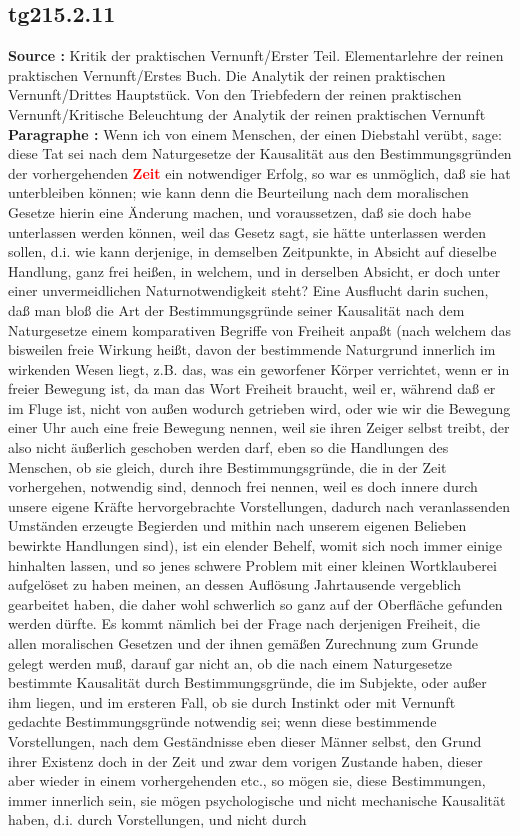 \documentclass[a4paper,12pt,twoside]{book}
\newcommand{\match}[1]{\textcolor{red}{\textbf{#1}}}
\begin{document}
	\subsection*{tg215.2.11} 
	\textbf{Source : }Kritik der praktischen Vernunft/Erster Teil. Elementarlehre der reinen praktischen Vernunft/Erstes Buch. Die Analytik der reinen praktischen Vernunft/Drittes Hauptstück. Von den Triebfedern der reinen praktischen Vernunft/Kritische Beleuchtung der Analytik der reinen praktischen Vernunft\\  
	
	\noindent\textbf{Paragraphe : }Wenn ich von einem Menschen, der einen Diebstahl verübt, sage: diese Tat sei nach dem Naturgesetze der Kausalität aus den Bestimmungsgründen der vorhergehenden \match{Zeit} ein notwendiger Erfolg, so war es unmöglich, daß sie hat unterbleiben können; wie kann denn die Beurteilung nach dem moralischen Gesetze hierin eine Änderung machen, und voraussetzen, daß sie doch habe unterlassen werden können, weil das Gesetz sagt, sie hätte unterlassen werden sollen, d.i. wie kann derjenige, in demselben Zeitpunkte, in Absicht auf dieselbe Handlung, ganz frei heißen, in welchem, und in  derselben Absicht, er doch unter einer unvermeidlichen Naturnotwendigkeit steht? Eine Ausflucht darin suchen, daß man bloß die Art der Bestimmungsgründe seiner Kausalität nach dem Naturgesetze einem komparativen Begriffe von Freiheit anpaßt (nach welchem das bisweilen freie Wirkung heißt, davon der bestimmende Naturgrund innerlich im wirkenden Wesen liegt, z.B. das, was ein geworfener Körper verrichtet, wenn er in freier Bewegung ist, da man das Wort Freiheit braucht, weil er, während daß er im Fluge ist, nicht von außen wodurch getrieben wird, oder wie wir die Bewegung einer Uhr auch eine freie Bewegung nennen, weil sie ihren Zeiger selbst treibt, der also nicht äußerlich geschoben werden darf, eben so die Handlungen des Menschen, ob sie gleich, durch ihre Bestimmungsgründe, die in der Zeit vorhergehen, notwendig sind, dennoch frei nennen, weil es doch innere durch unsere eigene Kräfte hervorgebrachte Vorstellungen, dadurch nach veranlassenden Umständen erzeugte Begierden und mithin nach unserem eigenen Belieben bewirkte Handlungen sind), ist ein elender Behelf, womit sich noch immer einige hinhalten lassen, und so jenes schwere Problem mit einer kleinen Wortklauberei aufgelöset zu haben meinen, an dessen Auflösung Jahrtausende vergeblich gearbeitet haben, die daher wohl schwerlich so ganz auf der Oberfläche gefunden werden dürfte. Es kommt nämlich bei der Frage nach derjenigen Freiheit, die allen moralischen Gesetzen und der ihnen gemäßen Zurechnung zum Grunde gelegt werden muß, darauf gar nicht an, ob die nach einem Naturgesetze bestimmte Kausalität durch Bestimmungsgründe, die im Subjekte, oder außer ihm liegen, und im ersteren Fall, ob sie durch Instinkt oder mit Vernunft gedachte Bestimmungsgründe notwendig sei; wenn diese bestimmende Vorstellungen, nach dem Geständnisse eben dieser Männer selbst, den Grund ihrer Existenz doch in der Zeit und zwar dem vorigen Zustande haben, dieser aber wieder in einem vorhergehenden etc., so mögen sie, diese Bestimmungen, immer innerlich sein, sie mögen psychologische und nicht mechanische Kausalität haben, d.i. durch Vorstellungen, und nicht durch 
\end{document}
